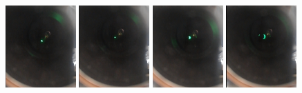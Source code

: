\begin{figure}[h!]
\vspace{0.15cm}
\includegraphics[width=0.24\textwidth]{Figure/05/video/5.jpg}
\hfill
\includegraphics[width=0.24\textwidth]{Figure/05/video/6.jpg}
\hfill
\includegraphics[width=0.24\textwidth]{Figure/05/video/7.jpg}
\hfill
\includegraphics[width=0.24\textwidth]{Figure/05/video/8.jpg}
\vfill


\end{figure}
